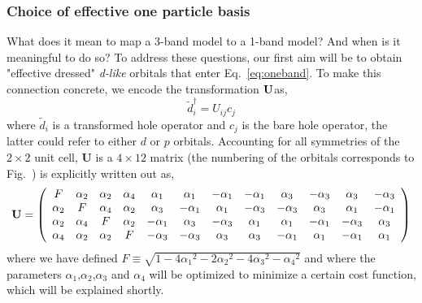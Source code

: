 \documentclass[prl,12pt,onecolumn,nofootinbib,notitlepage,english,superscriptaddress]{revtex4-1}
\newcommand{\HJC}[1]{{\color{RED}{\bf HJC: #1}}}
\begin{document}
%

\subsubsection{Choice of effective one particle basis}
What does it mean to map a 3-band model to a 1-band model? And when is it meaningful to do so? 
To address these questions, our first aim will be to obtain "effective dressed" \emph{d-like} 
orbitals that enter Eq.~\ref{eq:oneband}. To make this connection concrete, 
we encode the transformation ${\bf U}$as,
\begin{equation}
	\tilde{d}_i^{\dagger} = U_{ij} c_j
\end{equation}
where $\tilde{d}_i$ is a transformed hole operator and $c_j$ is the bare hole
operator, the latter could refer to either $d$ or $p$ orbitals. Accounting for all symmetries of 
the $2\times2$ unit cell, {\bf U} is a $4 \times 12 $ matrix (the numbering of the orbitals 
corresponds to Fig.~) is explicitly written out as, 
\begin{eqnarray}
{\bf U} = 
\left(
\begin{array}{cccccccccccc}
F        & \alpha_2 &        \alpha_2 &  \alpha_4 & \alpha_1 & \alpha_1 & -\alpha_1 & -\alpha_1 & \alpha_3 & -\alpha_3 & \alpha_3 & -\alpha_3 \\
\alpha_2 &  F       &        \alpha_4 &  \alpha_2 & \alpha_3 & -\alpha_1 & \alpha_1 & -\alpha_3 & -\alpha_3 & \alpha_3 & \alpha_1 & -\alpha_1 \\
\alpha_2 & \alpha_4 & F               &  \alpha_2 & -\alpha_1 & \alpha_3 & -\alpha_3 & \alpha_1 & \alpha_1 & -\alpha_1 & -\alpha_3 & \alpha_3 \\
\alpha_4 & \alpha_2 & \alpha_2        &   F       & -\alpha_3 & -\alpha_3 & \alpha_3 & \alpha_3 & -\alpha_1 & \alpha_1 & -\alpha_1 & \alpha_1 \\
\end{array}
\right)
\end{eqnarray}
where we have defined $F \equiv \sqrt{1-4{\alpha_1}^2 - 2{\alpha_2}^2 - 4 {\alpha_3}^2 -{\alpha_4}^2}$ and 
where the parameters $\alpha_1$,$\alpha_2$,$\alpha_3$ and $\alpha_4$ will be 
optimized to minimize a certain cost function, which will be explained shortly. 
\end{document}
